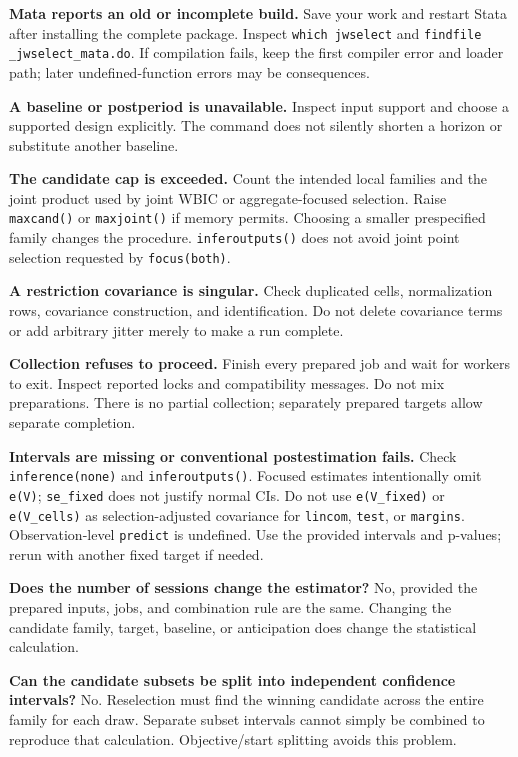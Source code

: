 \documentclass[11pt]{article}
\newcommand{\cmd}[1]{\texttt{#1}}
\begin{document}
\textbf{Mata reports an old or incomplete build.}
Save your work and restart Stata after installing the complete package. Inspect
\cmd{which jwselect} and \cmd{findfile \_jwselect\_mata.do}. If compilation
fails, keep the first compiler error and loader path; later undefined-function
errors may be consequences.

\textbf{A baseline or postperiod is unavailable.}
Inspect input support and choose a supported design explicitly. The command
does not silently shorten a horizon or substitute another baseline.

\textbf{The candidate cap is exceeded.}
Count the intended local families and the joint product used by joint WBIC
or aggregate-focused selection. Raise
\cmd{maxcand()} or \cmd{maxjoint()} if memory permits. Choosing a smaller
prespecified family changes the procedure. \cmd{inferoutputs()} does not
avoid joint point selection requested by \cmd{focus(both)}.

\textbf{A restriction covariance is singular.}
Check duplicated cells, normalization rows, covariance construction, and
identification. Do not delete covariance terms or add arbitrary jitter merely
to make a run complete.

\textbf{Collection refuses to proceed.}
Finish every prepared job and wait for workers to exit. Inspect reported
locks and compatibility messages. Do not mix preparations. There is no
partial collection; separately prepared targets allow separate completion.

\textbf{Intervals are missing or conventional postestimation fails.}
Check \cmd{inference(none)} and \cmd{inferoutputs()}. Focused estimates
intentionally omit \cmd{e(V)}; \cmd{se\_fixed} does not justify normal CIs.
Do not use \cmd{e(V\_fixed)} or \cmd{e(V\_cells)} as selection-adjusted
covariance for \cmd{lincom}, \cmd{test}, or \cmd{margins}.
Observation-level \cmd{predict} is undefined. Use the provided intervals and
p-values; rerun with another fixed target if needed.

\textbf{Does the number of sessions change the estimator?}
No, provided the prepared inputs, jobs, and combination rule are the same.
Changing the candidate family, target, baseline, or anticipation does change
the statistical calculation.

\textbf{Can the candidate subsets be split into independent confidence intervals?}
No. Reselection must find the winning candidate across the entire family for
each draw. Separate subset intervals cannot simply be combined to reproduce
that calculation. Objective/start splitting avoids this problem.
\end{document}
